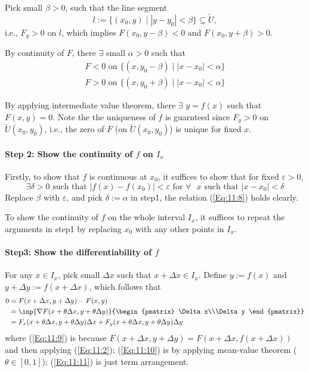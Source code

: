 Pick small $\beta>0$, such that the line segment
\begin{equation}
l:=\{(x_0,y)\mid |y-y_0|<\beta\}\subseteq\tilde U,
\end{equation}
i.e., $F_y>0$ on $l$, which implies $F(x_0,y-\beta)<0$ and $F(x_0,y+\beta)>0$.

By continuity of $F$, there $\exists$ small $\alpha>0$ such that
\begin{align}
\mbox{$F<0$ on $\{(x,y_0-\beta)\mid |x-x_0|<\alpha\}$}\\
\mbox{$F>0$ on $\{(x,y_0+\beta)\mid |x-x_0|<\alpha\}$}
\end{align}

By applying intermediate value theorem, there $\exists$ $y=f(x)$ such that $F(x,y)=0$. Note the the uniqueness of $f$ is guarnteed since $F_y>0$ on $\tilde U(x_0,y_0)$, i.e., the zero of $F$ (on $\tilde U(x_0,y_0)$) is unique for fixed $x$.
\paragraph{Step 2: Show the continuity of $f$ on $I_x$}
Firstly, to show that $f$ is continuous at $x_0$, it suffices to show that for fixed $\varepsilon>0$, 
\begin{equation}\label{Eq:11:8}
\mbox{$\exists\delta>0$ such that $|f(x) - f(x_0)|<\varepsilon$ for $\forall$ $x$ such that $|x-x_0|<\delta$}
\end{equation}
Replace $\beta$ with $\varepsilon$, and pick $\delta:=\alpha$ in step1, the relation (\ref{Eq:11:8}) holds clearly.

To show the continuity of $f$ on the whole interval $I_x$, it suffices to repeat the arguments in step1 by replacing $x_0$ with any other points in $I_x$.

\paragraph{Step3: Show the differentiability of $f$}
For any $x\in I_x$, pick small $\Delta x$ such that $x+\Delta x\in I_x$. Define $y:=f(x)$ and $y+\Delta y:=f(x+\Delta x)$, which follows that
\begin{align}
0&=F(x+\Delta x,y+\Delta y) - F(x,y)\label{Eq:11:9}\\
&=\inp{\nabla F(x+\theta\Delta x,y+\theta\Delta y)}{\begin{pmatrix}
\Delta x\\\Delta y
\end{pmatrix}}\label{Eq:11:10}\\
&=F_x(x+\theta\Delta x,y+\theta\Delta y)\Delta x
+
F_y(x+\theta\Delta x,y+\theta\Delta y)\Delta y\label{Eq:11:11}
\end{align}
where (\ref{Eq:11:9}) is because $F(x+\Delta x,y+\Delta y)=F(x+\Delta x,f(x+\Delta x))$ and then applying (\ref{Eq:11:2}); (\ref{Eq:11:10}) is by applying mean-value theorem ($\theta\in[0,1]$); (\ref{Eq:11:11}) is just term arrangement.

